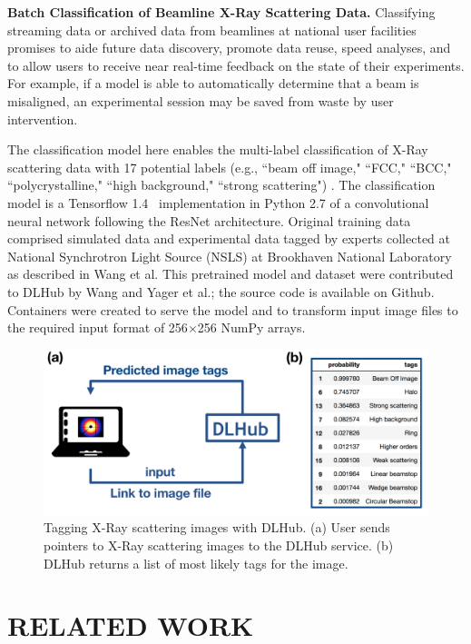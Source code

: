 \documentclass{aip-cp}
\begin{document}
\textbf{Batch Classification of Beamline X-Ray Scattering Data.}
Classifying streaming data or archived data from beamlines at national user
facilities promises to aide future data discovery, promote data reuse, speed
analyses, and to allow users to receive near real-time feedback on the state
of their experiments. For example, if a model is able to automatically
determine that a beam is misaligned, an experimental session may be saved from
waste by user intervention.

The classification model here enables the multi-label classification of X-Ray
scattering data with 17 potential labels (e.g., ``beam off image," ``FCC,"
``BCC," ``polycrystalline," ``high background," ``strong scattering") \cite{wang2017x}. The
classification model is a Tensorflow 1.4~\cite{abadi2016tensorflow} implementation in Python 2.7 of a
convolutional neural network following the ResNet architecture. Original
training data comprised simulated data and experimental data tagged by experts
collected at National Synchrotron Light Source (NSLS) at Brookhaven National
Laboratory as described in Wang et al. This pretrained model and dataset were
contributed to DLHub by Wang and Yager et al.; the source code is available 
on Github\cite{wang2017xcode}. Containers were created to serve
the model and to transform input image files to the
required input format of 256$\times$256 NumPy arrays.

\begin{figure}[h]
  \centerline{\includegraphics[width=5in]{Figs/DLHub-BNL.png}}
  \caption{Tagging X-Ray scattering images with DLHub. 
  (a) User sends pointers to X-Ray scattering images to the DLHub service. 
  (b) DLHub returns a list of most likely tags for the image.
\label{fig:dlhub-bnl}}
\end{figure}

\section{RELATED WORK}
\end{document}
